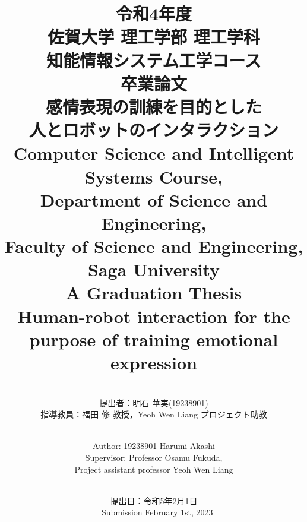 \documentclass[titlepage]{jarticle}
\begin{document}
\title{\huge
令和4年度\\佐賀大学 理工学部 理工学科\\
知能情報システム工学コース\\卒業論文\\
\vspace*{20mm}
\Huge
感情表現の訓練を目的とした\\人とロボットのインタラクション}
\author{\vspace*{20mm}\ \\
\Large
提出者：明石 華実(19238901)\\
指導教員：福田 修 教授，Yeoh Wen Liang プロジェクト助教}
\date{\vspace*{0mm}\
\Large
\\ 提出日：令和5年2月1日\\}
\maketitle
\thispagestyle{empty}
\begin{center}
\vspace*{40mm}
\title{\huge
Computer Science and Intelligent Systems Course,\\
Department of Science and Engineering,\\
Faculty of Science and Engineering,\\
Saga University\\
A Graduation Thesis\\
\vspace*{20mm}
\Huge{Human-robot interaction for the purpose of training emotional expression
}
}
\author{\vspace*{20mm}\ \\
\Large
Author:     19238901    Harumi Akashi\\
Supervisor: Professor   Osamu Fukuda, \\
Project assistant professor   Yeoh Wen Liang\\
           }
\date{\vspace*{0mm}\
\Large
Submission  February 1st, 2023\\}
\end{center}
\newpage
\thispagestyle{empty}
\maketitle
\end{document}
